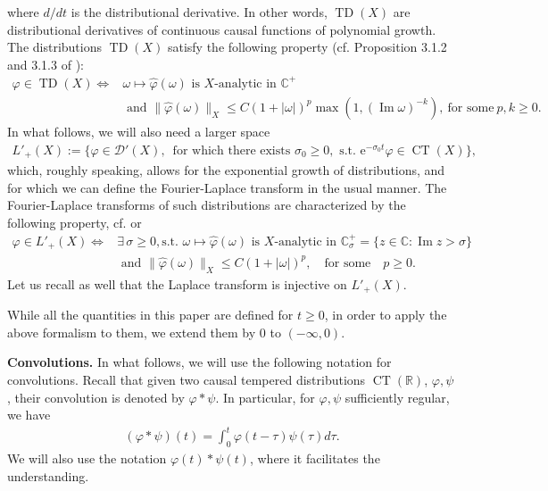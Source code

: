 \documentclass[]{article}
\numberwithin{equation}{section}
\numberwithin{theorem}{section}
\numberwithin{lemma}{section}
\numberwithin{corollary}{section}
\numberwithin{proposition}{section}
\numberwithin{definition}{section}
\renewcommand{\Im}{\operatorname{Im}}
\begin{document}
	where $d/dt$ is the distributional derivative. In other words, $\operatorname{TD}(X)$ are distributional derivatives of continuous causal functions of polynomial growth.
	The distributions $\operatorname{TD}(X)$ satisfy the following property (cf. Proposition 3.1.2 and 3.1.3 of \cite{sayas}): 
	\begin{align*}%
		\varphi\in \operatorname{TD}(X) \iff &\omega\mapsto\hat{\varphi}(\omega) \text { is $X$-analytic in }\mathbb{C}^+\\
		&\text{ and } \|\hat{\varphi}(\omega)\|_{X}\leq C (1+|\omega|)^p\max(1,(\Im \omega)^{-k}), ~ \text{for some}  ~ p,k\geq 0. 
	\end{align*}
	In what follows, we will also need a larger space \cite{bamberger_ha_duong} 
	\begin{align*}%
		L'_{+}(X):=\{\varphi\in \mathcal{D}'(X), \,\text{ for which there exists }\sigma_0\geq 0, \text{ s.t. } \mathrm{e}^{-\sigma_0 t}\varphi\in \operatorname{CT}(X)\},
	\end{align*}
	which, roughly speaking, allows for the exponential growth of distributions, and for which we can define the Fourier-Laplace transform in the usual manner. The Fourier-Laplace transforms of such distributions are characterized by the following property, cf. \cite{bamberger_ha_duong} or \cite[Chapter 16]{dautray_lions_vol5}
	\begin{align*}%
		\varphi\in {L}'_+(X) \iff &\exists\, \sigma\geq 0, \text{s.t. } \omega\mapsto\hat{\varphi}(\omega) \text { is $X$-analytic in }\mathbb{C}^+_{\sigma}=\{z\in \mathbb{C}: \Im z>\sigma\}\\
		& \text{ and }
		\|\hat{\varphi}(\omega)\|_{X}\leq C (1+|\omega|)^p,  \quad 
		\text{for some} \quad p\geq 0.  
	\end{align*}
	Let us recall as well that the Laplace transform is injective on $L'_+(X)$.
	
	While all the quantities in this paper are defined for $t\geq 0$, in order to apply the above formalism to them, we extend them by $0$ to $(-\infty,0)$. 
	
	\textbf{Convolutions. }In what follows, we will use the following notation for convolutions. Recall that given two causal tempered distributions $\operatorname{CT}(\mathbb{R})$, $\varphi, \psi$, their convolution is denoted by $\varphi*\psi$. In particular, for $\varphi, \psi$ sufficiently regular, we have 
	\begin{align*}
		(\varphi*\psi)(t)=\int_0^t\varphi(t-\tau)\psi(\tau)d\tau.
	\end{align*}
	We will also use the notation $\varphi(t)*\psi(t)$, where it facilitates the understanding. 
\end{document}
